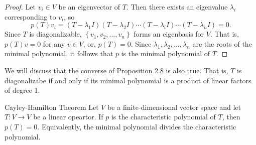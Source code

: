 \documentclass[linearalgebraII]{subfiles}
\begin{document}
    \begin{proof}
        Let $v_i\in V$ be an eigenvector of $T$. Then there exists an eigenvalue $\lambda_i$ corresponding to $v_i$, so
        \begin{equation*}
            p(T)v_i = \left( T-\lambda_1 I \right) \left( T-\lambda_2 I \right) \cdots \left( T-\lambda_i I \right) \cdots \left( T-\lambda_n I \right) = 0.
        \end{equation*}
        Since $T$ is diagonalizable, $\left\lbrace v_1, v_2, \ldots, v_n \right\rbrace$ forms an eigenbasis for $V$. That is, $p(T)v = 0$ for any $v\in V$, or, $p(T) = 0$. Since $\lambda_1, \lambda_2, \ldots, \lambda_n$ are the roots of the minimal polynomial, it follows that $p$ is the minimal polynomial of $T$.
    \end{proof}

    \begin{remark}
        We will discuss that the converse of Proposition 2.8 is also true. That is, $T$ is diagonalizabe if and only if its minimal polynomial is a product of linear factors of degree 1.
    \end{remark}

    \begin{theorem}{Cayley-Hamilton Theorem}
        Let $V$ be a finite-dimensional vector space and let $T: V\to V$ be a linear opeartor. If $p$ is the characteristic polynomial of $T$, then $p(T) = 0$. Equivalently, the minimal polynomial divides the characteristic polynomial. 
    \end{theorem}
\end{document}

